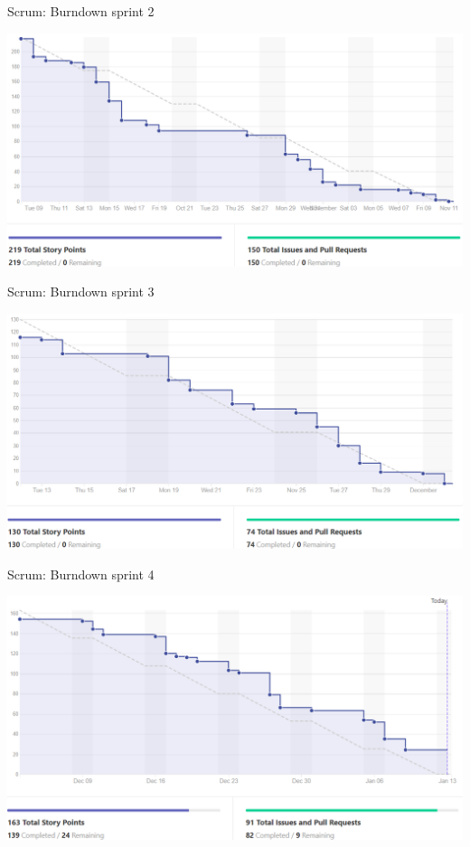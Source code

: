 \documentclass{beamer}
\begin{document}
\begin{frame}{Scrum: Burndown sprint 2}
	\begin{center}
		\includegraphics[width=\linewidth]{images/burn2.png}
	\end{center}
\end{frame}
\begin{frame}{Scrum: Burndown sprint 3}
	\begin{center}
		\includegraphics[width=\linewidth]{images/burn3.png}
	\end{center}
\end{frame}
\begin{frame}{Scrum: Burndown sprint 4}
	\begin{center}
		\includegraphics[width=\linewidth]{images/burn4.png}
	\end{center}
\end{frame}
\end{document}
